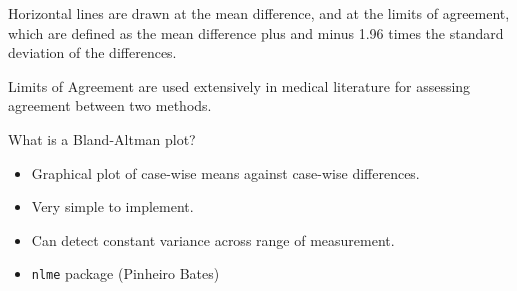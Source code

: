 \item Horizontal lines are drawn at the mean difference, and at the limits of agreement, which are defined as the mean difference plus and minus 1.96 times the standard deviation of the differences.

\item Limits of Agreement are used extensively in medical literature for assessing agreement between two methods.

\begin{frame}{\bf {}}
What is a Bland-Altman plot?
\begin{itemize}
\item Graphical plot of case-wise means against case-wise differences.
\item Very simple to implement.
\item Can detect constant variance across range of measurement.
\item \texttt{nlme} package (Pinheiro Bates)
\end{itemize}
\end{frame}


